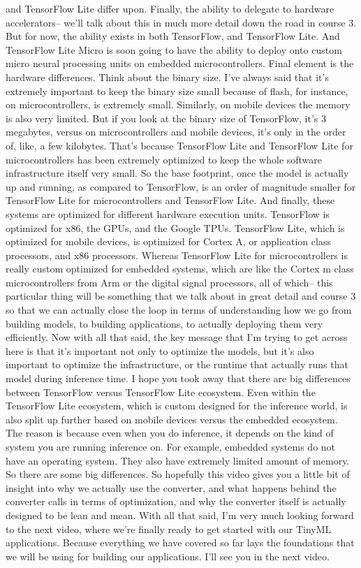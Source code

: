 and TensorFlow Lite differ upon.
Finally, the ability to delegate to hardware
accelerators-- we'll talk about this in much more detail down
the road in course 3.
But for now, the ability exists in both TensorFlow, and TensorFlow Lite.
And TensorFlow Lite Micro is soon going to have the ability
to deploy onto custom micro neural processing
units on embedded microcontrollers.
Final element is the hardware differences.
Think about the binary size.
I've always said that it's extremely important to keep the binary size small
because of flash, for instance, on microcontrollers, is extremely small.
Similarly, on mobile devices the memory is also very limited.
But if you look at the binary size of TensorFlow, it's 3 megabytes,
versus on microcontrollers and mobile devices,
it's only in the order of, like, a few kilobytes.
That's because TensorFlow Lite and TensorFlow Lite for microcontrollers
has been extremely optimized to keep the whole software
infrastructure itself very small.
So the base footprint, once the model is actually up and running,
as compared to TensorFlow, is an order of magnitude
smaller for TensorFlow Lite for microcontrollers and TensorFlow Lite.
And finally, these systems are optimized for different hardware execution units.
TensorFlow is optimized for x86, the GPUs, and the Google TPUs.
TensorFlow Lite, which is optimized for mobile devices,
is optimized for Cortex A, or application class processors,
and x86 processors.
Whereas TensorFlow Lite for microcontrollers
is really custom optimized for embedded systems,
which are like the Cortex m class microcontrollers
from Arm or the digital signal processors, all of which--
this particular thing will be something that we
talk about in great detail and course 3 so
that we can actually close the loop in terms
of understanding how we go from building models, to building applications,
to actually deploying them very efficiently.
Now with all that said, the key message that I'm trying to get across here
is that it's important not only to optimize the models,
but it's also important to optimize the infrastructure, or the runtime that
actually runs that model during inference time.
I hope you took away that there are big differences between TensorFlow
versus TensorFlow Lite ecosystem.
Even within the TensorFlow Lite ecosystem,
which is custom designed for the inference world,
is also split up further based on mobile devices
versus the embedded ecosystem.
The reason is because even when you do inference,
it depends on the kind of system you are running inference on.
For example, embedded systems do not have an operating system.
They also have extremely limited amount of memory.
So there are some big differences.
So hopefully this video gives you a little bit of insight
into why we actually use the converter, and what happens behind the converter
calls in terms of optimization, and why the converter
itself is actually designed to be lean and mean.
With all that said, I'm very much looking forward to the next video,
where we're finally ready to get started with our TinyML applications.
Because everything we have covered so far
lays the foundations that we will be using for building our applications.
I'll see you in the next video.


